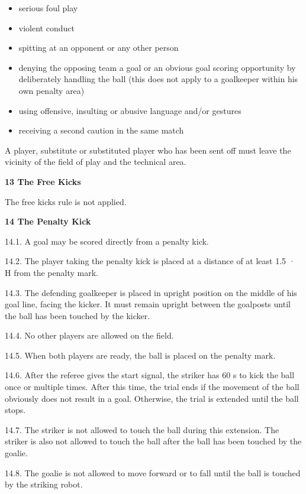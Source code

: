 \documentclass[a4paper]{article}
\begin{document}
\begin{itemize}
\item serious foul play
\item violent conduct 
\item spitting at an opponent or any other person 
\item denying the opposing team a goal or an obvious goal scoring opportunity by deliberately handling the ball (this does not apply to a goalkeeper within his own penalty area) 
\item using offensive, insulting or abusive language and/or gestures 
\item receiving a second caution in the same match
\end{itemize}

\bigskip

A player, substitute or substituted player who has been sent off must leave the vicinity of the field of play and the technical area.

\bigskip

\textbf{13 The Free Kicks}

The free kicks rule is not applied.

\bigskip

\textbf{14 The Penalty Kick}

14.1. A goal may be scored directly from a penalty kick.

14.2. The player taking the penalty kick is placed at a distance of at least 1.5  · H from the penalty mark.

14.3. The defending goalkeeper is placed in upright position on the middle of his goal line, facing the kicker. It must
remain upright between the goalposts until the ball has been touched by the kicker.

14.4. No other players are allowed on the field.

14.5. When both players are ready, the ball is placed on the penalty mark.

14.6. After the referee gives the start signal, the striker has 60 s to kick the ball once or multiple times. After this
time, the trial ends if the movement of the ball obviously does not result in a goal. Otherwise, the trial is extended
until the ball stops.

14.7. The striker is not allowed to touch the ball during this extension. The striker is also not allowed to touch the
ball after the ball has been touched by the goalie.

14.8. The goalie is not allowed to move forward or to fall until the ball is touched by the striking robot.
\end{document}
